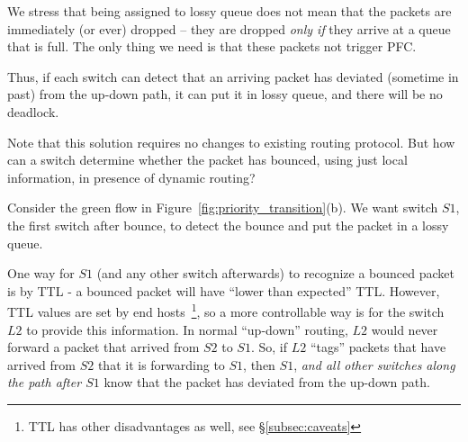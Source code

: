 We stress that being assigned to lossy queue does not mean that the packets are
immediately (or ever) dropped -- they are dropped {\em only if} they arrive at a
queue that is full. The only thing we need is that these packets not trigger
PFC.

Thus, if each switch can detect that an arriving packet has deviated (sometime
in past) from the up-down path, it can put it in lossy queue, and there will be
no deadlock.

Note that this solution requires no changes to existing routing protocol.  But
how can a switch determine whether the packet has bounced, using just local
information, in presence of dynamic routing?


Consider the green flow in Figure~\ref{fig:priority_transition}(b).  We want
switch $S1$, the first switch after bounce, to detect the bounce and put the
packet in a lossy queue. 

One way for $S1$ (and any other switch afterwards) to recognize a bounced packet
is by TTL - a bounced packet will have ``lower than expected'' TTL. However, TTL
values are set by end hosts~\footnote{TTL has other disadvantages as well,
see \S\ref{subsec:caveats}}, so a more controllable way is for the switch $L2$
to provide this information.  In normal ``up-down'' routing, $L2$ would never
forward a packet that arrived from $S2$ to $S1$. So, if $L2$ ``tags'' packets
that have arrived from $S2$ that it is forwarding to $S1$, then $S1$, {\em and
all other switches along the path after $S1$} know that the packet has deviated
from the up-down path.

